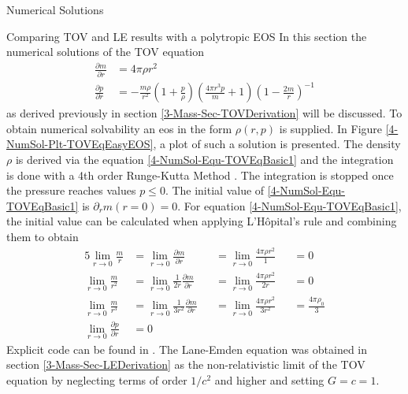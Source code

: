 \begin{section}{Numerical Solutions}
\begin{subsection}{Comparing TOV and LE results with a polytropic EOS}%
\label{4-NumSol-Sec-Comp-TOV-LE} %
In this section the numerical solutions of the \ac{TOV} equation
\begin{align}
	\frac{\partial m}{\partial r} &= 4\pi\rho r^2\label{4-NumSol-Equ-TOVEqBasic1}\\
	\frac{\partial p}{\partial r} &=-\frac{m\rho}{r^2}\left(1+\frac{p}{\rho}\right)\left(\frac{4\pi r^3p}{m}+1\right)\left(1-\frac{2m}{r}\right)^{-1}
	\label{4-NumSol-Equ-TOVEqBasic2}
\end{align}
as derived previously in section \ref{3-Mass-Sec-TOVDerivation} will be discussed.
To obtain numerical solvability an \ac{eos} in the form $\rho(r,p)$ is supplied.
In Figure \ref{4-NumSol-Plt-TOVEqEasyEOS}, a plot of such a solution is presented.
The density $\rho$ is derived via the equation \eqref{4-NumSol-Equ-TOVEqBasic1} and the integration is done with a 4th order Runge-Kutta Method \cite{rungeUeberNumerischeAufloesung1895, schlömilch1901zeitschrift, h.SimplifiedDerivationAnalysis2010}.
The integration is stopped once the pressure reaches values $p\leq0$. 
The initial value of \eqref{4-NumSol-Equ-TOVEqBasic1} is $\partial_r m(r=0)=0$. 
For equation \eqref{4-NumSol-Equ-TOVEqBasic1}, the initial value can be calculated when applying L'Hôpital's rule and combining them to obtain
\begin{alignat}{5}
	\lim\limits_{r\rightarrow0}\frac{m}{r} &= \lim\limits_{r\rightarrow0}\frac{\partial m}{\partial r} &&=\lim\limits_{r\rightarrow0}\frac{4\pi\rho r^2}{1} &&= 0\\
	\lim\limits_{r\rightarrow0}\frac{m}{r^2} &= \lim\limits_{r\rightarrow0}\frac{1}{2r}\frac{\partial m}{\partial r}  &&= \lim\limits_{r\rightarrow0}\frac{4\pi\rho r^2}{2r} &&= 0\\
	\lim\limits_{r\rightarrow0}\frac{m}{r^3} &= \lim\limits_{r\rightarrow0}\frac{1}{3r^2}\frac{\partial m}{\partial r} &&=\lim\limits_{r\rightarrow0}\frac{4\pi\rho r^2}{3r^2} &&= \frac{4\pi\rho_0}{3}\\
	\lim\limits_{r\rightarrow0}\frac{\partial p}{\partial r} &= 0
\end{alignat}
Explicit code can be found in \cite{pleyerGithubRepositoryJonas2021}. 
The Lane-Emden equation was obtained in section \ref{3-Mass-Sec-LEDerivation} as the non-relativistic limit of the \ac{TOV} equation by neglecting terms of order $1/c^2$ and higher and setting $G=c=1$. 

\end{subsection}
\end{section}
